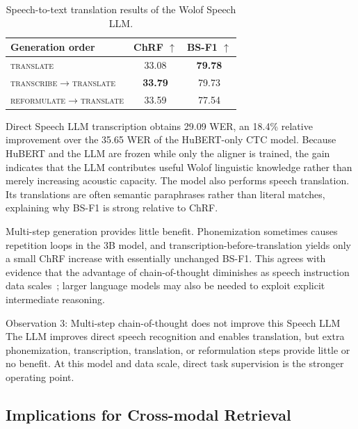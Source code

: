 \begin{table}[ht]
    \centering
    \begin{tabular}{lcc}
        \toprule
        \textbf{Generation order} & \textbf{ChRF \(\uparrow\)} & \textbf{BS-F1 \(\uparrow\)} \\
        \midrule
        \textsc{translate} & 33.08 & \textbf{79.78} \\
        \textsc{transcribe}\(\rightarrow\)\textsc{translate} & \textbf{33.79} & 79.73 \\
        \textsc{reformulate}\(\rightarrow\)\textsc{translate} & 33.59 & 77.54 \\
        \bottomrule
    \end{tabular}
    \caption{Speech-to-text translation results of the Wolof Speech LLM.}
    \label{tab:wolof-slm-translation}
\end{table}

Direct Speech LLM transcription obtains 29.09 WER, an 18.4\% relative improvement over the 35.65 WER of the HuBERT-only CTC model. Because HuBERT and the LLM are frozen while only the aligner is trained, the gain indicates that the LLM contributes useful Wolof linguistic knowledge rather than merely increasing acoustic capacity. The model also performs speech translation. Its translations are often semantic paraphrases rather than literal matches, explaining why BS-F1 is strong relative to ChRF.

Multi-step generation provides little benefit. Phonemization sometimes causes repetition loops in the 3B model, and transcription-before-translation yields only a small ChRF increase with essentially unchanged BS-F1. This agrees with evidence that the advantage of chain-of-thought diminishes as speech instruction data scales~\citep{pareras2025revisitingdirectspeechtotexttranslation}; larger language models may also be needed to exploit explicit intermediate reasoning.

\begin{insightbox}{Observation 3: Multi-step chain-of-thought does not improve this Speech LLM}
The LLM improves direct speech recognition and enables translation, but extra phonemization, transcription, translation, or reformulation steps provide little or no benefit. At this model and data scale, direct task supervision is the stronger operating point.
\end{insightbox}

\subsection{Implications for Cross-modal Retrieval}

